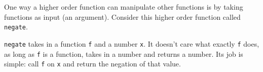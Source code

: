 One way a higher order function can manipulate other functions is by taking
functions as input (an argument). Consider this higher order function called
\texttt{negate}.

\texttt{negate} takes in a function \texttt{f} and a number \texttt{x}. It doesn't care what exactly \texttt{f} does, as long as \texttt{f} is a function, takes in a number and returns a number. Its job is simple: call \texttt{f} on \texttt{x} and return the negation of that value.
